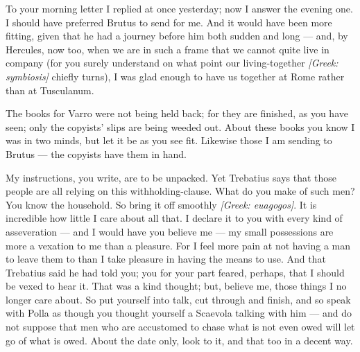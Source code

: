 

 To your morning letter I replied at once yesterday; now I answer the evening one. I should have preferred Brutus to send for me. And it would have been more fitting, given that he had a journey before him both sudden and long --- and, by Hercules, now too, when we are in such a frame that we cannot quite live in company (for you surely understand on what point our living-together \textit{[Greek: symbiosis]} chiefly turns), I was glad enough to have us together at Rome rather than at Tusculanum.

 The books for Varro were not being held back; for they are \dag{}finished\dag{}, as you have seen; only the copyists' slips are being weeded out. About these books you know I was in two minds, but let it be as you see fit. Likewise those I am sending to Brutus --- the copyists have them in hand.

 My instructions, you write, are to be unpacked. Yet Trebatius says that those people are all relying on this withholding-clause. What do you make of such men? You know the household. So bring it off smoothly \textit{[Greek: euagogos]}. It is incredible how little I care about all that. I declare it to you with every kind of asseveration --- and I would have you believe me --- my small possessions are more a vexation to me than a pleasure. For I feel more pain at not having a man to leave them to than I take pleasure in having the means to use. And that Trebatius said he had told you; you for your part feared, perhaps, that I should be vexed to hear it. That was a kind thought; but, believe me, those things I no longer care about. So put yourself into talk, cut through and finish, and so speak with Polla as though you thought yourself a Scaevola talking with him --- and do not suppose that men who are accustomed to chase what is not even owed will let go of what is owed. About the date only, look to it, and that too in a decent way.
